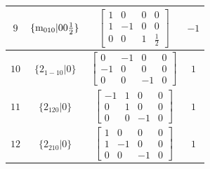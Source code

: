 \documentclass[fleqn,8pt]{jsarticle}
\begin{document}
\begin{longtable}{cccc}
$ 9 $ & $ \{{\rm m}_{010}|0 0 \frac{1}{2}\} $ & $ \begin{bmatrix} 1 & 0 & 0 & 0 \\ 1 & -1 & 0 & 0 \\ 0 & 0 & 1 & \frac{1}{2} \end{bmatrix} $ & $ -1 $ \\ \hline
$ 10 $ & $ \{2{}_{1-10}|0\} $ & $ \begin{bmatrix} 0 & -1 & 0 & 0 \\ -1 & 0 & 0 & 0 \\ 0 & 0 & -1 & 0 \end{bmatrix} $ & $ 1 $ \\ \hline
$ 11 $ & $ \{2{}_{120}|0\} $ & $ \begin{bmatrix} -1 & 1 & 0 & 0 \\ 0 & 1 & 0 & 0 \\ 0 & 0 & -1 & 0 \end{bmatrix} $ & $ 1 $ \\ \hline
$ 12 $ & $ \{2{}_{210}|0\} $ & $ \begin{bmatrix} 1 & 0 & 0 & 0 \\ 1 & -1 & 0 & 0 \\ 0 & 0 & -1 & 0 \end{bmatrix} $ & $ 1 $ \\
\end{longtable}
\end{document}
